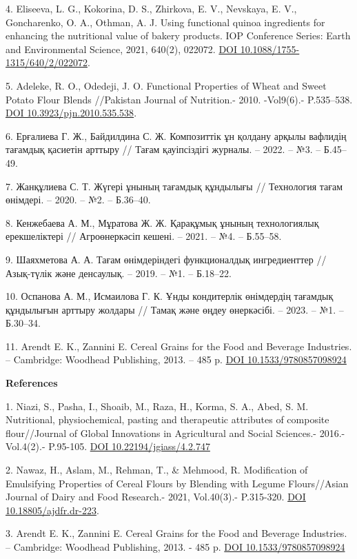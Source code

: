 4. Eliseeva, L. G., Kokorina, D. S., Zhirkova, E. V., Nevskaya, E. V.,
Goncharenko, O. A., Othman, A. J. Using functional quinoa ingredients
for enhancing the nutritional value of bakery products. IOP Conference
Series: Earth and Environmental Science, 2021, 640(2), 022072.
\href{https://doi.org/10.1088/1755-1315/640/2/022072}{DOI
10.1088/1755-1315/640/2/022072}.

5. Adeleke, R. O., Odedeji, J. O. Functional Properties of Wheat and
Sweet Potato Flour Blends //Pakistan Journal of Nutrition.-
2010. -Vol9(6).- P.535--538.
\href{https://doi.org/10.3923/pjn.2010.535.538}{DOI
10.3923/pjn.2010.535.538}.

6. Ерғалиева Г. Ж., Байдилдина С. Ж. Композиттік ұн қолдану арқылы
вафлидің тағамдық қасиетін арттыру // Тағам қауіпсіздігі журналы. --
2022. -- №3. -- Б.45--49.

7. Жанқұлиева С. Т. Жүгері ұнының тағамдық құндылығы // Технология тағам
өнімдері. -- 2020. -- №2. -- Б.36--40.

8. Кенжебаева А. М., Мұратова Ж. Ж. Қарақұмық ұнының технологиялық
ерекшеліктері // Агроөнеркәсіп кешені. -- 2021. -- №4. -- Б.55--58.

9. Шаяхметова А. А. Тағам өнімдеріндегі функционалдық ингредиенттер //
Азық-түлік және денсаулық. -- 2019. -- №1. -- Б.18--22.

10. Оспанова А. М., Исмаилова Г. К. Ұнды кондитерлік өнімдердің тағамдық
құндылығын арттыру жолдары // Тамақ және өңдеу өнеркәсібі. -- 2023. --
№1. -- Б.30--34.

11. Arendt E. K., Zannini E. Cereal Grains for the Food and Beverage
Industries. -- Cambridge: Woodhead Publishing, 2013. -- 485 p.
\href{https://doi.org/10.1533/9780857098924}{DOI 10.1533/9780857098924}

{\bfseries References}

1. Niazi, S., Pasha, I., Shoaib, M., Raza, H., Korma, S. A., Abed, S. M.
Nutritional, physiochemical, pasting and therapeutic attributes of
composite flour//Journal of Global Innovations in Agricultural and
Social Sciences.- 2016.-Vol.4(2).- P.95-105.
\href{https://doi.org/10.22194/jgiass/4.2.747}{DOI
10.22194/jgiass/4.2.747}

2. Nawaz, H., Aslam, M., Rehman, T., \& Mehmood, R. Modification of
Emulsifying Properties of Cereal Flours by Blending with Legume
Flours//Asian Journal of Dairy and Food Research.- 2021, Vol.40(3).-
P.315-320. \href{https://doi.org/10.18805/ajdfr.dr-223}{DOI
10.18805/ajdfr.dr-223}.

3. Arendt E. K., Zannini E. Cereal Grains for the Food and Beverage
Industries. -- Cambridge: Woodhead Publishing, 2013. - 485 p.
\href{https://doi.org/10.1533/9780857098924}{DOI 10.1533/9780857098924}

